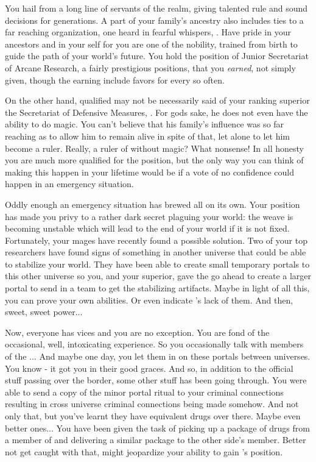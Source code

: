 \documentclass[char]{guildcamp3}
\begin{document}
	
	

\name{\cNobleTwo{}}


You hail from a long line of servants of the realm, giving talented rule and sound decisions for generations. A part of your family's ancestry also includes ties to a far reaching organization, one heard in fearful whispers, \bMagicMob{}. Have pride in your ancestors and in your self for you are one of the nobility, trained from birth to guide the path of your world's future. You hold the position of Junior Secretariat of Arcane Research, a fairly prestigious positions, that you \emph{earned}, not simply given, though the earning include favors for \bMagicMob{} every so often. 

On the other hand, qualified may not be necessarily said of your ranking superior the Secretariat of Defensive Measures, \cNobleOne{\intro}. For gods sake, he does not even have the ability to do magic. You can't believe that his family's influence was so far reaching as to allow him to remain alive in spite of that, let alone to let him become a ruler. Really, a ruler of \bMagicWorld{} without magic? What nonsense! In all honesty you are much more qualified for the position, but the only way you can think of making this happen in your lifetime would be if a vote of no confidence could happen in an emergency situation. 

Oddly enough an emergency situation has brewed all on its own. Your position has made you privy to a rather dark secret plaguing your world: the weave is becoming unstable which will lead to the end of your world if it is not fixed. Fortunately, your mages have recently found a possible solution. Two of your top researchers have found signs of something in another universe that could be able to stabilize your world. They have been able to create small temporary portals to this other universe so you, and your superior, gave the go ahead to create a larger portal to send in a team to get the stabilizing artifacts. Maybe in light of all this, you can prove your own abilities. Or even indicate \cNobleOne{}'s lack of them. And then, sweet, sweet power...

Now, everyone has vices and you are no exception. You are fond of the occasional, well, intoxicating experience. So you occasionally talk with members of the \bTechMob{}... And maybe one day, you let them in on these portals between universes. You know - it got you in their good graces. And so, in addition to the official stuff passing over the border, some other stuff has been going through. You were able to send a copy of the minor portal ritual to your criminal connections resulting in cross universe criminal connections being made somehow. And not only that, but you've learnt they have equivalent drugs over there. Maybe even better ones... You have been given the task of picking up a package of drugs from a member of \bTechMob{} and delivering a similar package to the other side's member. Better not get caught with that, might jeopardize your ability to gain \cNobleOne{}'s position.
\end{document}
